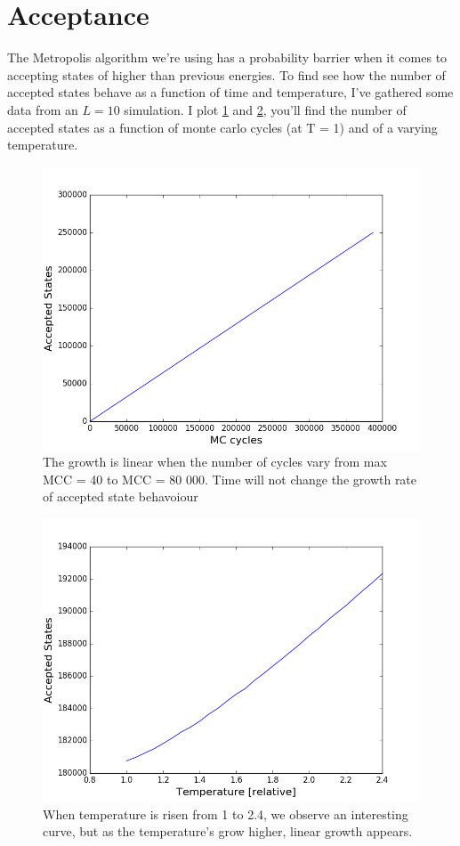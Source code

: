 \documentclass[%
oneside,                 %
final,                   %
10pt]{article}
\begin{document}
\section{Acceptance}
The Metropolis algorithm we're using has a probability barrier when it comes to accepting states of higher than previous energies.
To find see how the number of accepted states behave as a function of time and temperature, I've gathered some data from an 
$L = 10$ simulation. I plot \ref{accept} and \ref{acceptt}, you'll  find the number of accepted states as a function of monte carlo cycles (at T = 1) and
of a varying temperature. 
\begin{figure}
 \includegraphics[scale=0.5]{accept}
 \caption{The growth is linear when the number of cycles vary from max MCC = 40 to MCC = 80 000. Time will not change the growth rate of accepted state behavoiour}
 \label{accept}
 \end{figure}
\begin{figure}
 \includegraphics[scale=0.5]{acceptt}
 \caption{When temperature is risen from 1 to 2.4, we observe an interesting curve, but as the temperature's grow higher, linear growth appears.}
 \label{acceptt}
\end{figure}
\end{document}
